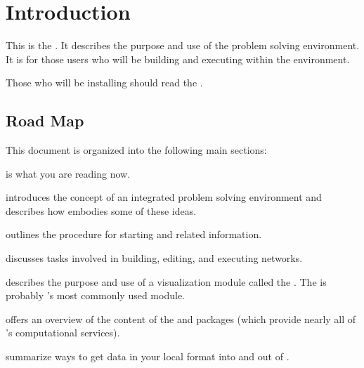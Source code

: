%

\section{Introduction}
\label{sec:intro}


This is the \etitle{\srug}.  It describes the purpose and use of the \sr{}
problem solving environment.  It is for those users who will be building
and executing  within the \sr{} environment.

Those who will be installing \sr{} should read the
\htmladdnormallinkfoot{\srig{}}{\installguideurl}.




\subsection{Road Map}
\label{sec:roadmap}

This document is organized into the following main sections:

\begin{description}
  \item {} is what you are reading now.
  \item {} introduces the concept of an
        integrated problem solving environment  and describes how \SR{}
        embodies some of these ideas.
  \item {}  outlines the procedure for
        starting \sr{} and related information.
  \item {} discusses tasks
        involved in building, editing, and executing networks.
  \item {} describes the
        purpose and use of a visualization module called the \viewer{}.  The
        \viewer{} is probably \sr{}'s most commonly used module.
  \item {} offers an overview of the content
        of the \sr{} and \pse{} packages (which provide nearly all of
        \sr{}'s computational services).
  \item {} summarize ways to
        get data in your local format into and out of \SR{}.
\end{description}

